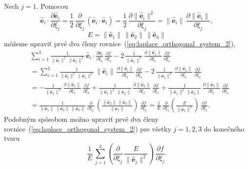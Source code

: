 \documentclass[a4paper, 12pt]{book}
\let\vec\mathbf
\begin{document}
Nech $j = 1$.  Pomocou
%
\begin{equation}
\hat{\vec e}_i \cdot \frac{\partial \hat{\vec e}_i}{\partial \xi_j} 
= \frac{1}{2} \, \frac{\partial}{\partial \xi_j} \, \left( \hat{\vec e}_i \cdot 
\hat{\vec e}_i \right) = \frac{1}{2} \, \frac{\partial \| \hat{\vec e}_i 
\|^2}{\partial \xi_j} = \| \hat{\vec e}_i \| \, \frac{\partial \| \hat{\vec 
e}_i \|}{\partial \xi_j}{,}
\end{equation}
%
\begin{equation}
\label{eq:e_laplace}
E = \| \hat{\vec e}_1  \| \, \| \hat{\vec e}_2  \| \, \| \hat{\vec e}_3  \|
\end{equation}
%
môžeme upraviť prvé dva členy rovnice~(\ref{eq:laplace_orthogonal_system_2}),
%
\begin{equation}
\label{eq:laplace_orthogonal_system_two_terms}
\begin{split}
&\sum_{i = 1}^{3} \frac{1}{\| \hat{\vec e}_i \|^2 \, \| \hat{\vec e}_1 \|^2} \, 
\hat{\vec e}_i \cdot \frac{\partial \hat{\vec e}_i}{\partial \xi_1} \, 
\frac{\partial f}{\partial \xi_1}
- 2\, \frac{1}{\|\hat{\vec e}_1 \|^3} \, \frac{\partial \| \hat{\vec e}_1 
\|}{\partial \xi_1} \, \frac{\partial f}{\partial \xi_1}\\
%
&= \sum_{i = 1}^{3} \frac{1}{\| \hat{\vec e}_i \|^2 \, \| \hat{\vec e}_1 \|^2} 
\, \| \hat{\vec e}_i \| \, \frac{\partial \| \hat{\vec e}_i \|}{\partial \xi_1} 
\, \frac{\partial f}{\partial \xi_1}
- 2\, \frac{1}{\|\hat{\vec e}_1 \|^3} \, \frac{\partial \| \hat{\vec e}_1 
\|}{\partial \xi_1} \, \frac{\partial f}{\partial \xi_1}\\
%
&= -\frac{1}{\| \hat{\vec e}_1 \|^3} \, \frac{\partial \| \hat{\vec e}_1 
\|}{\partial \xi_1} \, \frac{\partial f}{\partial \xi_1} + \frac{1}{\| 
\hat{\vec e}_1 \|^2 \, \| \hat{\vec e}_2 \|} \, \frac{\partial \| \hat{\vec 
e}_2 \|}{\partial \xi_1} \, \frac{\partial f}{\partial \xi_1} + \frac{1}{\| 
\hat{\vec e}_1 \|^2 \, \| \hat{\vec e}_3 \|} \, \frac{\partial \| \hat{\vec 
e}_3 \|}{\partial \xi_1} \, \frac{\partial f}{\partial \xi_1}\\
%
&= \frac{1}{\| \hat{\vec e}_1 \| \, \| \hat{\vec e}_2 \| \, \| \hat{\vec e}_3 
\|} \, \frac{\partial}{\partial \xi_1} \, \left( \frac{\| \hat{\vec e}_2 \| \, 
\| \hat{\vec e}_3 \|}{\| \hat{\vec e}_1 \|} \right) \, \frac{\partial 
f}{\partial \xi_1} = \frac{1}{E} \, \frac{\partial}{\partial \xi_1} \left( 
\frac{E}{\| \hat{\vec e}_1 \|^2} \right) \, \frac{\partial f}{\partial 
\xi_1}{.}
\end{split}
\end{equation}
%
Podobným spôsobom možno upraviť prvé dva členy 
rovnice~(\ref{eq:laplace_orthogonal_system_2}) pre všetky $j = 1, 2, 3$ do 
konečného tvaru
%
\begin{equation}
\label{eq:laplace_orthogonal_system_two_terms_final}
\frac{1}{E} \, \sum_{j = 1}^3 \left( \frac{\partial}{\partial \xi_j} \, 
\frac{E}{\| \hat{\vec e}_j \|^2}\right) \, \frac{\partial f}{\partial \xi_j}{.}
\end{equation}
\end{document}
